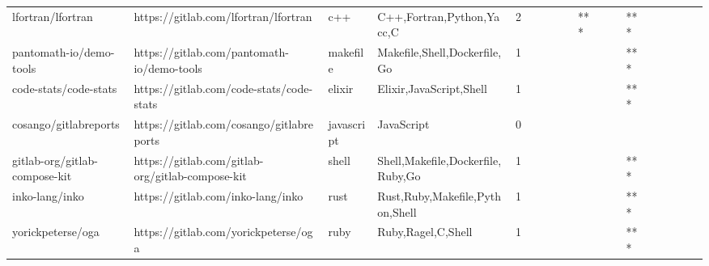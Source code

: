 \begin{tabular}{llllrlllllllllllll}
lfortran/lfortran                                  &               https://gitlab.com/lfortran/lfortran &               c++ &                          C++,Fortran,Python,Yacc,C &       2 &         &        &           &                &             *** &        &           &       *** &          &          &       &              &          \\
pantomath-io/demo-tools                            &         https://gitlab.com/pantomath-io/demo-tools &          makefile &                       Makefile,Shell,Dockerfile,Go &       1 &         &        &           &                &                 &        &           &       *** &          &          &       &              &          \\
code-stats/code-stats                              &           https://gitlab.com/code-stats/code-stats &            elixir &                            Elixir,JavaScript,Shell &       1 &         &        &           &                &                 &        &           &       *** &          &          &       &              &          \\
cosango/gitlabreports                              &           https://gitlab.com/cosango/gitlabreports &        javascript &                                         JavaScript &       0 &         &        &           &                &                 &        &           &           &          &          &       &              &          \\
gitlab-org/gitlab-compose-kit                      &   https://gitlab.com/gitlab-org/gitlab-compose-kit &             shell &                  Shell,Makefile,Dockerfile,Ruby,Go &       1 &         &        &           &                &                 &        &           &       *** &          &          &       &              &          \\
inko-lang/inko                                     &                  https://gitlab.com/inko-lang/inko &              rust &                    Rust,Ruby,Makefile,Python,Shell &       1 &         &        &           &                &                 &        &           &       *** &          &          &       &              &          \\
yorickpeterse/oga                                  &               https://gitlab.com/yorickpeterse/oga &              ruby &                                 Ruby,Ragel,C,Shell &       1 &         &        &           &                &                 &        &           &       *** &          &          &       &              &          \\

\end{tabular}
